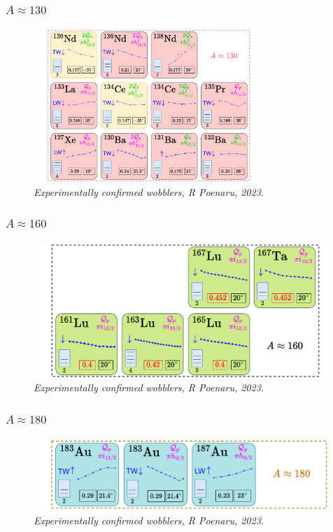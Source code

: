 \documentclass{beamer}
\begin{document}
\begin{frame}
    \frametitle{$A\approx130$}
    \begin{figure}
        \centering
        \includegraphics[width=0.75\textwidth]{figures/wobblers-chart-2.pdf}
        \caption{\textit{Experimentally confirmed wobblers, R Poenaru, 2023.}}
    \end{figure}
\end{frame}

\begin{frame}
    \frametitle{$A\approx160$}
    \begin{figure}
        \centering
        \includegraphics[width=0.99\textwidth]{figures/wobblers-chart-4.pdf}
        \caption{\textit{Experimentally confirmed wobblers, R Poenaru, 2023.}}
    \end{figure}
\end{frame}

\begin{frame}
    \frametitle{$A\approx180$}
    \begin{figure}
        \centering
        \includegraphics[width=0.99\textwidth]{figures/wobblers-chart-3.pdf}
        \caption{\textit{Experimentally confirmed wobblers, R Poenaru, 2023.}}
    \end{figure}
\end{frame}
\end{document}
